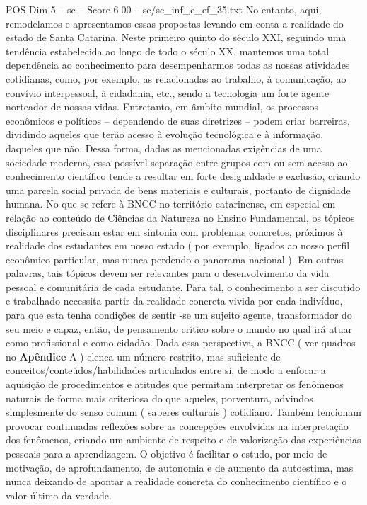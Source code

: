\begin{textsample}{POS Dim 5 – sc – Score 6.00 – sc/sc\_inf\_e\_ef\_35.txt}
No entanto, aqui, remodelamos e apresentamos essas propostas levando em conta a realidade do estado de Santa Catarina.
Neste primeiro quinto do século XXI, seguindo uma tendência estabelecida ao longo de todo o século XX, mantemos uma total dependência ao conhecimento para desempenharmos todas as nossas atividades cotidianas, como, por exemplo, as relacionadas ao trabalho, à comunicação, ao convívio interpessoal, à cidadania, etc., sendo a tecnologia um forte agente norteador de nossas vidas.
Entretanto, em âmbito mundial, os processos econômicos e políticos – dependendo de suas diretrizes – podem criar barreiras, dividindo aqueles que terão acesso à evolução tecnológica e à informação, daqueles que não.
Dessa forma, dadas as mencionadas exigências de uma sociedade moderna, essa possível separação entre grupos com ou sem acesso ao conhecimento científico tende a resultar em forte desigualdade e exclusão, criando uma parcela social privada de bens materiais e culturais, portanto de dignidade humana.
No que se refere à BNCC no território catarinense, em especial em relação ao conteúdo de Ciências da Natureza no Ensino Fundamental, os tópicos disciplinares precisam estar em sintonia com problemas concretos, próximos à realidade dos estudantes em nosso estado ( por exemplo, ligados ao nosso perfil econômico particular, mas nunca perdendo o panorama nacional ).
Em outras palavras, tais tópicos devem ser relevantes para o desenvolvimento da vida pessoal e comunitária de cada estudante.
Para tal, o conhecimento a ser discutido e trabalhado necessita partir da realidade concreta vivida por cada indivíduo, para que esta tenha condições de sentir -se um sujeito agente, transformador do seu meio e capaz, então, de pensamento crítico sobre o mundo no qual irá atuar como profissional e como cidadão.
Dada essa perspectiva, a BNCC ( ver quadros no \textbf{Apêndice} A ) elenca um número restrito, mas suficiente de conceitos/conteúdos/habilidades articulados entre si, de modo a enfocar a aquisição de procedimentos e atitudes que permitam interpretar os fenômenos naturais de forma mais criteriosa do que aqueles, porventura, advindos simplesmente do senso comum ( saberes culturais ) cotidiano.
Também tencionam provocar continuadas reflexões sobre as concepções envolvidas na interpretação dos fenômenos, criando um ambiente de respeito e de valorização das experiências pessoais para a aprendizagem.
O objetivo é facilitar o estudo, por meio de motivação, de aprofundamento, de autonomia e de aumento da autoestima, mas nunca deixando de apontar a realidade concreta do conhecimento científico e o valor último da verdade.

\end{textsample}
